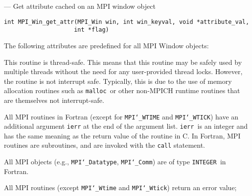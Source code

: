 \startmanpage
{}
--- Get attribute cached on an MPI window object 
\startvb\begin{verbatim}
int MPI_Win_get_attr(MPI_Win win, int win_keyval, void *attribute_val, 
                    int *flag)

\end{verbatim}
\endvb

\par
{}
\par
{}
The following attributes are predefined for all MPI Window objects:
\par
{}
\par
{}
\par
This routine is thread-safe.  This means that this routine may be
safely used by multiple threads without the need for any user-provided
thread locks.  However, the routine is not interrupt safe.  Typically,
this is due to the use of memory allocation routines such as {\tt malloc
}or other non-MPICH runtime routines that are themselves not interrupt-safe.
\par
{}
All MPI routines in Fortran (except for {\tt MPI{\tt \char`\_}WTIME} and {\tt MPI{\tt \char`\_}WTICK}) have
an additional argument {\tt ierr} at the end of the argument list.  {\tt ierr
}is an integer and has the same meaning as the return value of the routine
in C.  In Fortran, MPI routines are subroutines, and are invoked with the
{\tt call} statement.
\par
All MPI objects (e.g., {\tt MPI{\tt \char`\_}Datatype}, {\tt MPI{\tt \char`\_}Comm}) are of type {\tt INTEGER
}in Fortran.
\par
{}
\par
All MPI routines (except {\tt MPI{\tt \char`\_}Wtime} and {\tt MPI{\tt \char`\_}Wtick}) return an error value;
